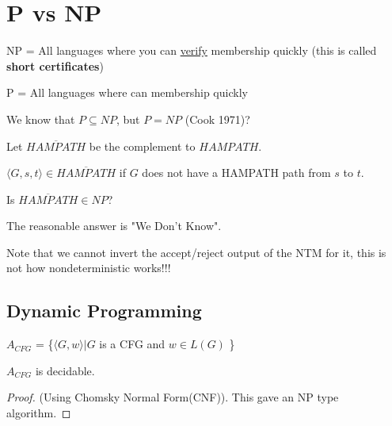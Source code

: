 \section{P vs NP}

\begin{intuition}
    NP = All languages where you can \underline{verify} membership quickly (this is called \textbf{short certificates})

    P = All languages where can  membership quickly
\end{intuition}

We know that \(P \subseteq NP\), but \(P = NP\) (Cook 1971)? 

\begin{problem}
    Let \(\overline{HAMPATH}\) be the complement to \(HAMPATH\). 

    \(\langle G, s, t \rangle \in \overline{HAMPATH}\) if \(G\) does not have a HAMPATH path from \(s\) to \(t\).   

    Is \(\overline{HAMPATH} \in NP\)? 

    The reasonable answer is "We Don't Know". 

    Note that we cannot invert the accept/reject output of the NTM for it, this is not how nondeterministic works!!!
\end{problem}

\subsection{Dynamic Programming}
\begin{theorem}[Recall]
    \(A_{CFG}\) = \{\(\langle G, w \rangle | G\) is a CFG and \(w \in L(G)\) \} 

    \(A_{CFG}\) is decidable. 
\end{theorem}
\begin{proof}

    (Using Chomsky Normal Form(CNF)). This gave an NP type algorithm.
\end{proof}


